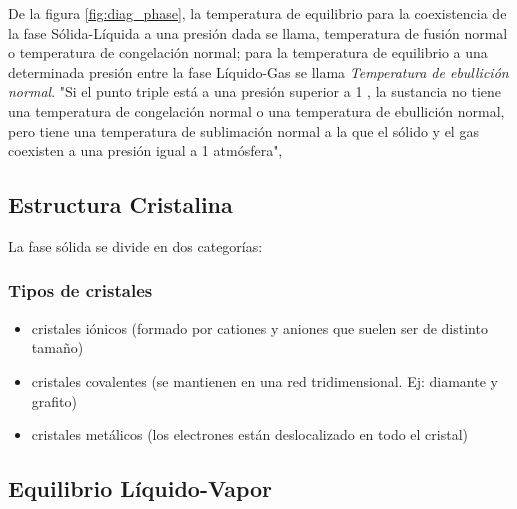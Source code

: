      

De la figura \ref{fig:diag_phase}, la temperatura de equilibrio para la coexistencia de la fase Sólida-Líquida a una presión dada se llama, temperatura de fusión normal o temperatura de congelación normal; para la temperatura de equilibrio a una determinada presión entre la fase Líquido-Gas se llama {\it Temperatura de ebullición normal}. "Si el punto triple está a una presión superior a 1 , la sustancia no tiene una temperatura de congelación normal o una temperatura de ebullición normal, pero tiene una temperatura de sublimación normal a la que el sólido y el gas coexisten a una presión igual a 1 atmósfera", \parencite[pp. 28]{Mortimer2008} %

\subsection{Estructura Cristalina}
    La fase sólida se divide en dos categorías:

    \subsubsection*{Tipos de cristales}
    \begin{itemize}
      \item cristales iónicos (formado por cationes y aniones que suelen ser de distinto tamaño)
      \item cristales covalentes (se mantienen en una red tridimensional. Ej: diamante y grafito)
      \item cristales metálicos (los electrones están deslocalizado en todo el cristal)
    \end{itemize}


\subsection{Equilibrio Líquido-Vapor}
    

